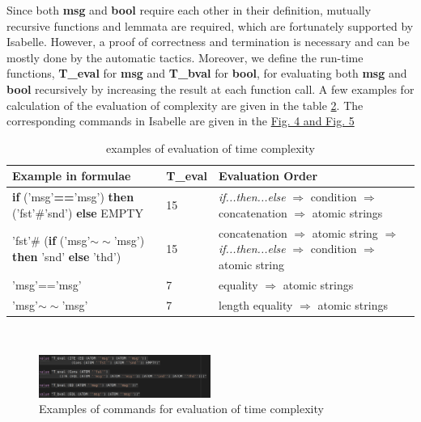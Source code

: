 \documentclass[conference]{IEEEtran}
\begin{document}
Since both \textbf{msg} and \textbf{bool} require each other in their definition, mutually recursive functions and lemmata are required, which are fortunately supported by Isabelle. However, a proof of correctness and termination is necessary and can be mostly done by the automatic tactics. Moreover, we define the run-time functions, \textbf{T\_eval} for \textbf{msg} and \textbf{T\_bval} for \textbf{bool}, for evaluating both \textbf{msg} and \textbf{bool} recursively by increasing the result at each function call. A few examples for calculation of the evaluation of complexity are given in the table \hyperref[table:2]{2}. The corresponding commands in Isabelle are given in the  \hyperref[bcterms]{Fig. 4 and Fig. 5}
\begin{table}[ht]
\centering
\begin{tabular}{ ||p{3cm}|p{0.8cm}|p{3cm}|| }
     \hline
      Example in formulae & T\_eval & Evaluation Order\\
     \hline
     \rowcolor{gray!30}
     \textbf{if} ('msg'\textbf{==}'msg') \textbf{then} ('fst'\#'snd') \textbf{else} EMPTY & 15 & \textit{if...then...else} $\Rightarrow$ condition $\Rightarrow$ concatenation $\Rightarrow$ atomic strings \\
    'fst'\# (\textbf{if} ('msg'\textbf{$\sim\sim$}'msg') \textbf{then} 'snd' \textbf{else} 'thd') & 15 &
    concatenation $\Rightarrow$ atomic string $\Rightarrow$ \textit{if...then...else} $\Rightarrow$ condition $\Rightarrow$ atomic string\\
    \rowcolor{gray!30}
    'msg'=='msg' & 7 & equality $\Rightarrow$ atomic strings\\
    'msg'$\sim\sim$'msg' & 7 & length equality $\Rightarrow$ atomic strings\\
     \hline
\end{tabular}
\\[10pt]
\caption{examples of evaluation of time complexity}
\label{table:2}
\end{table}
\begin{figure}
\centering
   \includegraphics[width=0.5\textwidth]{Isabelle_command_1.png}
\caption{Examples of commands for evaluation of time complexity}\label{figure:3}
\end{figure}
\end{document}
